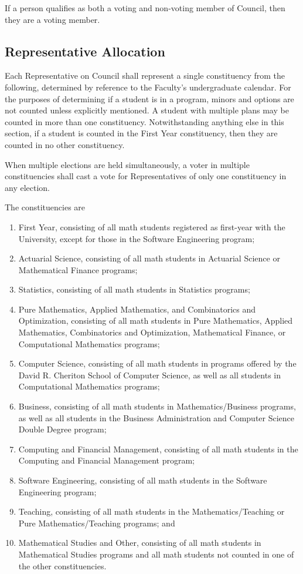 If a person qualifies as both a voting and non-voting member of Council, then
they are a voting member.

\subsection{Representative Allocation}
Each Representative on Council shall represent a single constituency from the
following, determined by reference to the Faculty's undergraduate calendar. For
the purposes of determining if a student is in a program, minors and options are
not counted unless explicitly mentioned. A student with multiple plans may be
counted in more than one constituency. Notwithstanding anything else in this
section, if a student is counted in the First Year constituency, then they are
counted in no other constituency.

When multiple elections are held simultaneously, a voter in multiple
constituencies shall cast a vote for Representatives of only one constituency in
any election.

The constituencies are
\begin{enumerate}
  \item First Year, consisting of all math students registered as first-year
    with the University, except for those in the Software Engineering program;
  \item Actuarial Science, consisting of all math students in Actuarial Science
    or Mathematical Finance programs;
  \item Statistics, consisting of all math students in Statistics programs;
  \item Pure Mathematics, Applied Mathematics, and Combinatorics and
    Optimization, consisting of all math students in Pure Mathematics, Applied
    Mathematics, Combinatorics and Optimization, Mathematical Finance, or
    Computational Mathematics programs;
  \item Computer Science, consisting of all math students in programs offered by
    the David R. Cheriton School of Computer Science, as well as all students in
    Computational Mathematics programs;
  \item Business, consisting of all math students in Mathematics/Business
    programs, as well as all students in the Business Administration and
    Computer Science Double Degree program;
  \item Computing and Financial Management, consisting of all math students in
    the Computing and Financial Management program;
  \item Software Engineering, consisting of all math students in the Software
    Engineering program;
  \item Teaching, consisting of all math students in the
    Mathematics/Teaching or Pure Mathematics/Teaching programs;
    and
  \item Mathematical Studies and Other, consisting of all math students in
    Mathematical Studies programs and all math students not counted in one of
    the other constituencies.
\end{enumerate}

